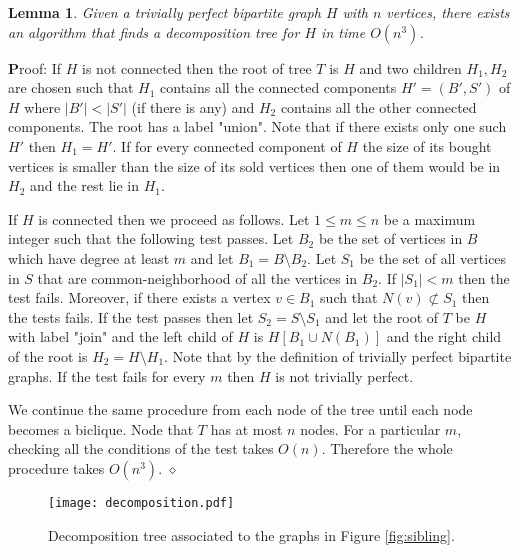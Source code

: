 \documentclass[letterpaper,11pt,abstracton]{scrartcl}
\newcommand{\qed}{\hfill$\diamond$}
\newcommand{\pf}{{\textbf Proof: }}
\newtheorem{lemma}[theorem]{Lemma}
\begin{document}
\begin{lemma}\label{lm:make-tree}
  Given a trivially perfect bipartite graph $H$ with $n$ vertices, there exists an algorithm that finds a decomposition tree for $H$ in 
  time $O(n^3)$.
\end{lemma}
\pf If $H$ is not connected then the root of tree $T$ is $H$ and
two children $H_1,H_2$ are chosen such that $H_1$ contains all the connected components $H'=(B',S')$ of $H$ where $|B'| < |S'|$ (if there is any)
and $H_2$ contains all the other connected components. The root has a label "union". Note that if there exists only one such $H'$ then $H_1=H'$.
If for every connected component of $H$ the size of its bought vertices is smaller than the size of its sold vertices then one of them would be in $H_2$ and the rest lie in $H_1$.

If $H$ is connected then we proceed as follows.
Let $1 \le m \le n$ be a maximum integer such that the following test passes.
Let $B_2$ be the set of vertices in $B$ which have degree at least $m$ and let $B_1=B \setminus B_2$. Let $S_1$ be the set of all vertices in $S$
that are common-neighborhood of all the vertices in $B_2$. If $|S_1| < m$ then the test fails. Moreover, if there exists a vertex $v \in B_1$ such that $N(v) \not\subset S_1$ then
the tests fails. If the test passes then let $S_2=S \setminus S_1$ and let the root of $T$ be $H$ with label "join" and the
left child of $H$ is $H[B_1 \cup N(B_1)]$ and the
right child of the root is $H_2= H \setminus H_1$. Note that by the definition of trivially perfect bipartite graphs.
If the test fails for every $m$ then $H$ is not trivially perfect.

We continue the same procedure from each node of the tree until  each node becomes a biclique. Node that $T$ has at most $n$ nodes. For a particular $m$, checking all the conditions of the test takes
$O(n)$. Therefore the whole procedure takes $O(n^3)$.
 \qed \\

\begin{figure}[htbp]
 \begin{center}
\texttt{[image: decomposition.pdf]}
\caption{
Decomposition tree associated to the graphs in Figure \ref{fig:sibling}.
}
    \label{fig:decomposition}
  \end{center}
 \end{figure}
\end{document}
